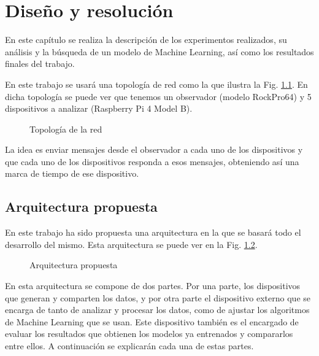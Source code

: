 
\chapter{Diseño y resolución} \label{chap:diseno}

En este capítulo se realiza la descripción de los experimentos realizados, su análisis y la búsqueda de un modelo de Machine Learning, así como los resultados finales del trabajo.

En este trabajo se usará una topología de red como la que ilustra la Fig. \ref{fig:top}. En dicha topología se puede ver que tenemos un observador (modelo RockPro64) y 5 dispositivos a analizar (Raspberry Pi 4 Model B).

\begin{figure}
    \centering
    \resizebox{0.7\textwidth}{!}{
        
    }
    \caption{Topología de la red}
    \label{fig:top}
\end{figure}

La idea es enviar mensajes desde el observador a cada uno de los dispositivos y que cada uno de los dispositivos responda a esos mensajes, obteniendo así una marca de tiempo de ese dispositivo.

\section{Arquitectura propuesta}

En este trabajo ha sido propuesta una arquitectura en la que se basará todo el desarrollo del mismo. Esta arquitectura se puede ver en la Fig. \ref{fig:architecture}.

\begin{figure}
    \centering
    
    \caption{Arquitectura propuesta}
    \label{fig:architecture}
\end{figure}

En esta arquitectura se compone de dos partes. Por una parte, los dispositivos que generan y comparten los datos, y por otra parte el dispositivo externo que se encarga de tanto de analizar y procesar los datos, como de ajustar los algoritmos de Machine Learning que se usan. Este dispositivo también es el encargado de evaluar los resultados que obtienen los modelos ya entrenados y compararlos entre ellos. A continuación se explicarán cada una de estas partes.

